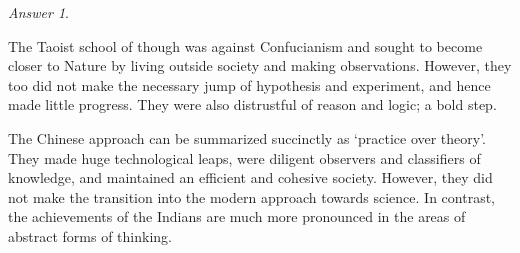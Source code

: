 \documentclass[11pt]{article}
\theoremstyle{remark}
\newtheorem*{answer}{Answer}
\begin{document}
\begin{answer}
\begin{enumerate}
            The Taoist school of though was against Confucianism and sought to become
            closer to Nature by living outside society and making observations.
            However, they too did not make the necessary jump of hypothesis and
            experiment, and hence made little progress. They were also distrustful of
            reason and logic; a bold step.
        \end{enumerate}

        The Chinese approach can be summarized succinctly as `practice over theory'.
        They made huge technological leaps, were diligent observers and classifiers
        of knowledge, and maintained an efficient and cohesive society. However, they
        did not make the transition into the modern approach towards science. In
        contrast, the achievements of the Indians are much more pronounced in the
        areas of abstract forms of thinking.
    \end{answer}
    
\end{document}
